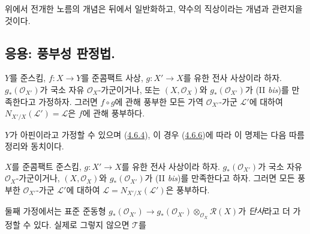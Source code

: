\begin{remark}[6.5.9]
\label{II.6.5.9-ko}
위에서 전개한 노름의 개념은 뒤에서 일반화하고, 약수의 직상이라는
개념과 관련지을 것이다.
\end{remark}

\subsection{응용: 풍부성 판정법.}
\label{subsection:II.6.6-ko}

\begin{proposition}[6.6.1]
\label{II.6.6.1-ko}
$Y$를 준스킴, $f:X\to Y$를 준콤팩트 사상,
$g:X'\to X$를 유한 전사 사상이라 하자.
$g_*(\mathcal{O}_{X'})$가 국소 자유 $\mathcal{O}_X$-가군이거나, 또는
$(X,\mathcal{O}_X)$와 $g_*(\mathcal{O}_{X'})$가 (II
\emph{bis})를 만족한다고 가정하자. 그러면 $f\circ g$에 관해
풍부한 모든 가역 $\mathcal{O}_{X'}$-가군 $\mathcal{L}'$에 대하여
$N_{X'/X}(\mathcal{L}')=\mathcal{L}$은 $f$에 관해 풍부하다.
\end{proposition}

$Y$가 아핀이라고 가정할 수 있으며
(\hyperref[II.4.6.4-ko]{4.6.4}), 이 경우
(\hyperref[II.4.6.6-ko]{4.6.6})에 따라 이 명제는 다음 따름정리와
동치이다.

\begin{corollary}[6.6.2]
\label{II.6.6.2-ko}
$X$를 준콤팩트 준스킴, $g:X'\to X$를 유한 전사 사상이라 하자.
$g_*(\mathcal{O}_{X'})$가 국소 자유 $\mathcal{O}_X$-가군이거나,
$(X,\mathcal{O}_X)$와 $g_*(\mathcal{O}_{X'})$가 (II \emph{bis})를
만족한다고 하자. 그러면 모든 풍부한 $\mathcal{O}_{X'}$-가군
$\mathcal{L}'$에 대하여
$\mathcal{L}=N_{X'/X}(\mathcal{L}')$은 풍부하다.
\end{corollary}

둘째 가정에서는 표준 준동형
$g_*(\mathcal{O}_{X'})\to
g_*(\mathcal{O}_{X'})\otimes_{\mathcal{O}_X}\mathcal{R}(X)$가
\emph{단사}라고 더 가정할 수 있다. 실제로 그렇지 않으면
$\mathcal{T}$를


